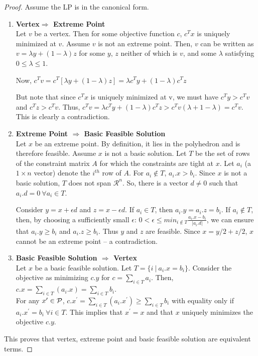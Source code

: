 \documentclass[11pt]{article}
\begin{document}
\begin{proof}
Assume the LP is in the canonical form.
\begin{enumerate}
\item {\bf Vertex$\Rightarrow$ Extreme Point } \\
Let $v$ be a vertex. Then for some objective function $c$, $c^Tx$ is uniquely minimized at $v$. Assume $v$ is not an extreme point. Then, $v$ can be written as $v=\lambda y+(1-\lambda)z$ for some $y$, $z$ neither of which is $v$, and some $\lambda$ satisfying $0\leq \lambda\leq 1$.

Now, $c^Tv=c^T[\lambda y+(1-\lambda)z]=\lambda c^Ty+(1-\lambda)c^Tz$

But note that since $c^{T}x$ is uniquely minimized at v, we must have $c^{T}y > c^{T}v$ and $c^{T}z > c^{T}v$. Thus, $c^{T}v = \lambda c^Ty+(1-\lambda)c^Tz > c^{T}v (\lambda + 1 - \lambda) = c^{T}v$. 
This is clearly a contradiction.

\item {\bf Extreme Point $\Rightarrow$ Basic Feasible Solution} \\
Let $x$ be an extreme point. By definition, it lies in the polyhedron and is therefore feasible. Assume $x$ is not a basic solution.
Let $T$ be the set of rows of the constraint matrix $A$ for which the constraints are tight at $x$. Let $a_i$ (a $1 \times n$ vector) denote the $i^{th}$ row of $A$. For $a_i \notin T$, $a_i.x > b_i$. Since $x$ is not a basic solution, $T$ does not span ${\mathcal R}^n$. So, there is a vector $d \neq 0$ such that
$a_i.d = 0\ \forall a_i \in T$. 

Consider $y=x+\epsilon d$ and $z=x-\epsilon d$. If $a_i\in T$, then $a_i.y=a_i.z=b_i$. If $a_i\notin T$, then, by choosing a sufficiently small $\epsilon$: $0 < \epsilon \leq min_{i\notin T}\frac{a_i.x - b_i}{|a_i.d|}$, we can ensure that $a_i.y \geq b_i$ and $a_i.z \geq b_i$. Thus $y$ and $z$ are feasible. Since $x=y/2+z/2$, $x$ cannot be an extreme point -- a contradiction.

\item {\bf Basic Feasible Solution $\Rightarrow$ Vertex} \\
Let $x$ be a basic feasible solution. Let $T = \{i\ |\ a_i.x = b_i\}$. Consider the objective as 
minimizing $c.y$ for $c = \sum_{i \in T} a_i$. Then,
$c.x = \sum_{i \in T}(a_i.x) = \sum_{i \in T}b_i$.\\
For any $x^{\prime} \in {\cal P}$, $c.x^{\prime} = \sum_{i \in T} (a_i.x^{\prime})
 \geq \sum_{i \in T} b_i$ with equality only if $a_i.x^{\prime} = b_i\ \forall
i \in T$. This implies that $x^{\prime} = x$ and that $x$ uniquely 
minimizes the objective $c.y$. 
\end{enumerate}
This proves that vertex, extreme point and basic feasible solution are equivalent terms. 
\end{proof}
\end{document}
